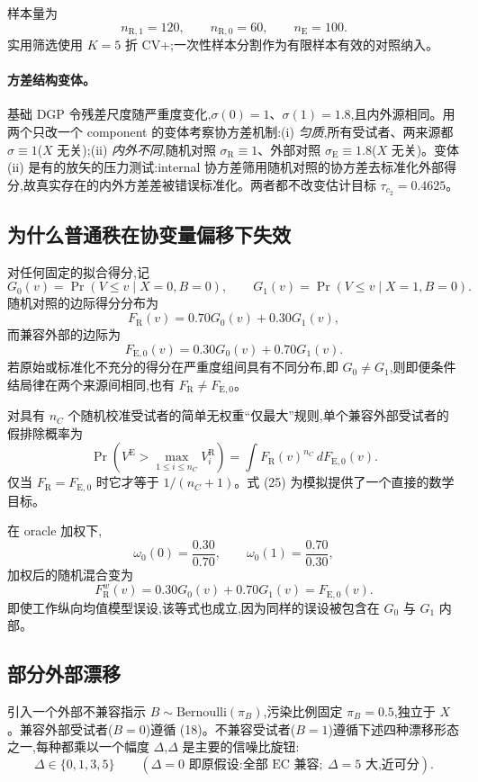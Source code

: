 \documentclass[11pt]{article}
\newcommand{\R}{\mathrm{R}}
\newcommand{\E}{\mathrm{E}}
\begin{document}
样本量为
\[
n_{\R,1}=120,
\qquad
n_{\R,0}=60,
\qquad
n_{\E}=100.
\tag{22}
\]
实用筛选使用 $K=5$ 折 CV+;一次性样本分割作为有限样本有效的对照纳入。

\paragraph{方差结构变体。}
基础 DGP 令残差尺度随严重度变化,$\sigma(0){=}1$、$\sigma(1){=}1.8$,且内外源相同。用两个只改一个 component 的变体考察协方差机制:(i) \emph{匀质},所有受试者、两来源都 $\sigma{\equiv}1$($X$ 无关);(ii) \emph{内外不同},随机对照 $\sigma_{\R}{\equiv}1$、外部对照 $\sigma_{\E}{\equiv}1.8$($X$ 无关)。变体 (ii) 是有的放矢的压力测试:internal 协方差筛用随机对照的协方差去标准化外部得分,故真实存在的内外方差差被错误标准化。两者都不改变估计目标 $\tau_{c_2}{=}0.4625$。

\subsection{为什么普通秩在协变量偏移下失效}

对任何固定的拟合得分,记
\[
G_0(v)=\Pr(V\le v\mid X=0,B=0),
\qquad
G_1(v)=\Pr(V\le v\mid X=1,B=0).
\]
随机对照的边际得分分布为
\[
F_{\R}(v)=0.70G_0(v)+0.30G_1(v),
\tag{23}
\]
而兼容外部的边际为
\[
F_{\E,0}(v)=0.30G_0(v)+0.70G_1(v).
\tag{24}
\]
若原始或标准化不充分的得分在严重度组间具有不同分布,即 $G_0\neq G_1$,则即便条件结局律在两个来源间相同,也有 $F_{\R}\neq F_{\E,0}$。

对具有 $n_C$ 个随机校准受试者的简单无权重``仅最大''规则,单个兼容外部受试者的假排除概率为
\[
\Pr\left(V^{\E}>\max_{1\le i\le n_C}V_i^{\R}\right)
=
\int F_{\R}(v)^{n_C}\,dF_{\E,0}(v).
\tag{25}
\]
仅当 $F_{\R}=F_{\E,0}$ 时它才等于 $1/(n_C+1)$。式 (25) 为模拟提供了一个直接的数学目标。

在 oracle 加权下,
\[
\omega_0(0)=\frac{0.30}{0.70},
\qquad
\omega_0(1)=\frac{0.70}{0.30},
\tag{26}
\]
加权后的随机混合变为
\[
F_{\R}^{w}(v)
=0.30G_0(v)+0.70G_1(v)
=F_{\E,0}(v).
\tag{27}
\]
即使工作纵向均值模型误设,该等式也成立,因为同样的误设被包含在 $G_0$ 与 $G_1$ 内部。

\subsection{部分外部漂移}

引入一个外部不兼容指示 $B\sim\mathrm{Bernoulli}(\pi_B)$,污染比例固定 $\pi_B=0.5$,独立于 $X$。兼容外部受试者($B=0$)遵循 (18)。不兼容受试者($B=1$)遵循下述四种漂移形态之一,每种都乘以一个幅度 $\Delta$,$\Delta$ 是主要的信噪比旋钮:
\[
\Delta\in\{0,1,3,5\}
\qquad
(\Delta=0\text{ 即原假设:全部 EC 兼容};\ \Delta=5\text{ 大,近可分}).
\tag{28}
\]
\end{document}
